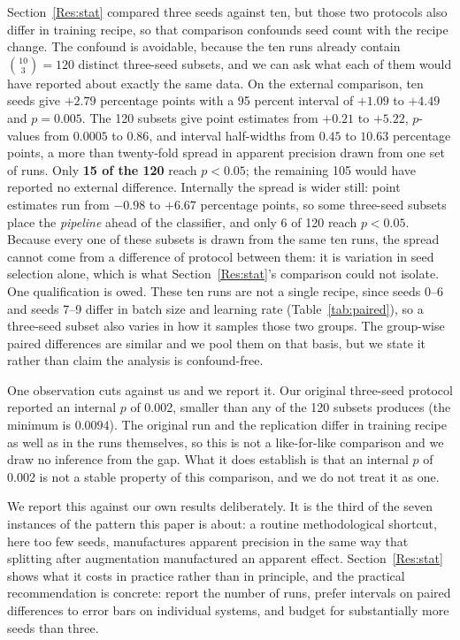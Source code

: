 \documentclass{melba}
\begin{document}
Section~\ref{Res:stat} compared three seeds against ten, but those two protocols also differ in training recipe, so that comparison confounds seed count with the recipe change. The confound is avoidable, because the ten runs already contain $\binom{10}{3}=120$ distinct three-seed subsets, and we can ask what each of them would have reported about exactly the same data. On the external comparison, ten seeds give $+2.79$ percentage points with a 95 percent interval of $+1.09$ to $+4.49$ and $p=0.005$. The 120 subsets give point estimates from $+0.21$ to $+5.22$, $p$-values from $0.0005$ to $0.86$, and interval half-widths from $0.45$ to $10.63$ percentage points, a more than twenty-fold spread in apparent precision drawn from one set of runs. Only \textbf{15 of the 120} reach $p<0.05$; the remaining 105 would have reported no external difference. Internally the spread is wider still: point estimates run from $-0.98$ to $+6.67$ percentage points, so some three-seed subsets place the \emph{pipeline} ahead of the classifier, and only 6 of 120 reach $p<0.05$. Because every one of these subsets is drawn from the same ten runs, the spread cannot come from a difference of protocol between them: it is variation in seed selection alone, which is what Section~\ref{Res:stat}'s comparison could not isolate. One qualification is owed. These ten runs are not a single recipe, since seeds 0--6 and seeds 7--9 differ in batch size and learning rate (Table~\ref{tab:paired}), so a three-seed subset also varies in how it samples those two groups. The group-wise paired differences are similar and we pool them on that basis, but we state it rather than claim the analysis is confound-free.

One observation cuts against us and we report it. Our original three-seed protocol reported an internal $p$ of 0.002, smaller than any of the 120 subsets produces (the minimum is $0.0094$). The original run and the replication differ in training recipe as well as in the runs themselves, so this is not a like-for-like comparison and we draw no inference from the gap. What it does establish is that an internal $p$ of 0.002 is not a stable property of this comparison, and we do not treat it as one.

We report this against our own results deliberately. It is the third of the seven instances of the pattern this paper is about: a routine methodological shortcut, here too few seeds, manufactures apparent precision in the same way that splitting after augmentation manufactured an apparent effect. Section~\ref{Res:stat} shows what it costs in practice rather than in principle, and the practical recommendation is concrete: report the number of runs, prefer intervals on paired differences to error bars on individual systems, and budget for substantially more seeds than three.
\end{document}
